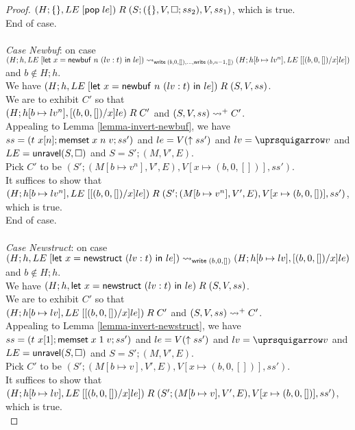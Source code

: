 \begin{proof}
  $(H;\{\}, \fplug{LE}{\epop\;le})\;R\;(S;(\{\}, V, \symhole;ss_2), V, ss_1)$, which is true. \\
  End of case. \\
  \\
  \emph{Case Newbuf}: on case $(H;h, \fplug{LE}{\elet{x}{\enewbuf{n}{(lv:t)}}{le}})\step_{\symwrite\;(b,0,[]),\dots,\symwrite\;(b,n-1,[])}(H;h[b\mapsto lv^n], \fplug{LE}{\subst{x}{(b,0,[])}{le}})$ and $b\not\in H;h$. \\
  We have $(H;h, \fplug{LE}{\elet{x}{\enewbuf{n}{(lv:t)}}{le}})\;R\;(S, V, ss)$. \\
  We are to exhibit $C'$ so that \\
  $(H;h[b\mapsto lv^n], \subst{x}{(b,0,[])}{le})\;R\;C'$ and $(S, V, ss)\step^+C'$. \\
  Appealing to Lemma \ref{lemma-invert-newbuf}, we have $ss=(\earray{t}{x}{n};\memset{x}{n}{v};ss')$ and $le=V(\ctolow{ss'})$ and $lv=\ctolowe{v}$ and $LE=\unravel(S, \symhole)$ and $S=S';(M, V', E)$. \\
  Pick $C'$ to be $(S';(M[b\mapsto v^n], V', E), V[x\mapsto(b,0, [])], ss')$. \\
  It suffices to show that $(H;h[b\mapsto lv^n], \fplug{LE}{\subst{x}{(b,0,[])}{le}})\;R\;(S';(M[b\mapsto v^n], V', E), V[x\mapsto(b,0,[])], ss')$, which is true. \\
  End of case. \\
  \\
  \emph{Case Newstruct}: on case $(H;h,\fplug{LE}{\elet{x}{\enewstruct{(lv:t)}}{le}})\step_{\symwrite\;(b,0,[])}(H;h[b\mapsto lv], \subst{x}{(b,0,[])}{le})$ and $b\not\in H;h$. \\
  We have $(H;h, \elet{x}{\enewstruct{(lv:t)}}{le})\;R\;(S, V, ss)$. \\
  We are to exhibit $C'$ so that \\
  $(H;h[b\mapsto lv], \fplug{LE}{\subst{x}{(b,0,[])}{le}})\;R\;C'$ and $(S, V, ss)\step^+C'$. \\
  Appealing to Lemma \ref{lemma-invert-newstruct}, we have $ss=(\earray{t}{x}{1};\memset{x}{1}{v};ss')$ and $le=V(\ctolow{ss'})$ and $lv=\ctolowe{v}$ and $LE=\unravel(S, \symhole)$ and $S=S';(M, V', E)$. \\
  Pick $C'$ to be $(S';(M[b\mapsto v], V', E), V[x\mapsto(b,0, [])], ss')$. \\
  It suffices to show that $(H;h[b\mapsto lv], \fplug{LE}{\subst{x}{(b,0,[])}{le}})\;R\;(S';(M[b\mapsto v], V', E), V[x\mapsto(b,0,[])], ss')$, which is true. \\

\end{proof}
